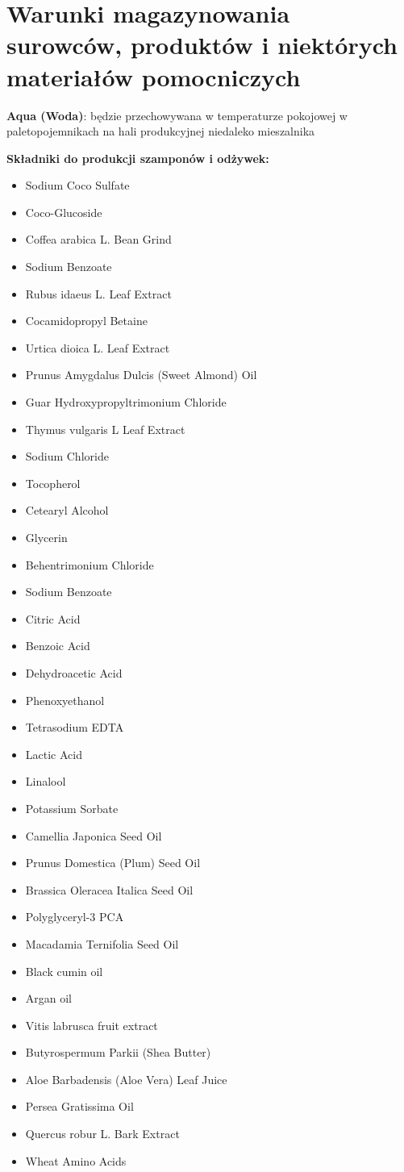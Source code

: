 \section{Warunki magazynowania surowców, produktów i niektórych materiałów pomocniczych}

\textbf{Aqua (Woda)}: będzie przechowywana w temperaturze pokojowej w paletopojemnikach na hali produkcyjnej niedaleko mieszalnika\vspace{\baselineskip}

\textbf{Składniki do produkcji szamponów i odżywek:}
\begin{itemize}
	\item Sodium Coco Sulfate
	\item Coco-Glucoside
	\item Coffea arabica L. Bean Grind
	\item Sodium Benzoate
	\item Rubus idaeus L. Leaf Extract
	\item Cocamidopropyl Betaine
	\item Urtica dioica L. Leaf Extract
	\item Prunus Amygdalus Dulcis (Sweet Almond) Oil
	\item Guar Hydroxypropyltrimonium Chloride
	\item Thymus vulgaris L Leaf Extract
	\item Sodium Chloride
	\item Tocopherol
	\item Cetearyl Alcohol
	\item Glycerin
	\item Behentrimonium Chloride
	\item Sodium Benzoate
	\item Citric Acid
	\item Benzoic Acid
	\item Dehydroacetic Acid
	\item Phenoxyethanol
	\item Tetrasodium EDTA
	\item Lactic Acid
	\item Linalool
	\item Potassium Sorbate
	\item Camellia Japonica Seed Oil
	\item Prunus Domestica (Plum) Seed Oil
	\item Brassica Oleracea Italica Seed Oil
	\item Polyglyceryl-3 PCA
	\item Macadamia Ternifolia Seed Oil
	\item Black cumin oil
	\item Argan oil
	\item Vitis labrusca fruit extract
	\item Butyrospermum Parkii (Shea Butter)
	\item Aloe Barbadensis (Aloe Vera) Leaf Juice
	\item Persea Gratissima Oil
	\item Quercus robur L. Bark Extract
	\item Wheat Amino Acids
\end{itemize}

